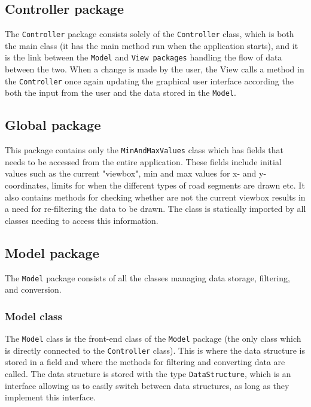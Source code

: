 \documentclass[a4paper,11pt]{article}
\begin{document}
\subsection{Controller package} %
The \texttt{Controller} package consists solely of the \texttt{Controller} class, which is both the main class (it has the main method run when the application starts), and it is the link between the \texttt{Model} and \texttt{View packages} handling the flow of data between the two. When a change is made by the user, the View calls a method in the \texttt{Controller} once again updating the graphical user interface according the both the input from the user and the data stored in the \texttt{Model}.

\subsection{Global package} %
This package contains only the \texttt{MinAndMaxValues} class which has fields that needs to be accessed from the entire application. These fields include initial values such as the current "viewbox", min and max values for x- and y-coordinates, limits for when the different types of road segments are drawn etc. It also contains methods for checking whether are not the current viewbox results in a need for re-filtering the data to be drawn. The class is statically imported by all classes needing to access this information.

\subsection{Model package} %
The \texttt{Model} package consists of all the classes managing data storage, filtering, and conversion.

\subsubsection{Model class} %
The \texttt{Model} class is the front-end class of the \texttt{Model} package (the only class which is directly connected to the \texttt{Controller} class). This is where the data structure is stored in a field and where the methods for filtering and converting data are called. The data structure is stored with the type \texttt{DataStructure}, which is an interface allowing us to easily switch between data structures, as long as they implement this interface.
\end{document}

